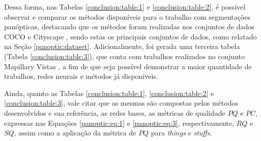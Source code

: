 Dessa forma, nas Tabelas \ref{conclusion:table:1} e \ref{conclusion:table:2}, é possível observar e comparar os métodos disponíveis para o trabalho com segmentações panópticas, destacando que os métodos foram realizadas nos conjuntos de dados COCO \cite{Lin2014} e Cityscape \cite{Cordts2016}, sendo estas os principais conjuntos de dados, como relatado na Seção \ref{panoptic:dataset}. Adicionalmente, foi gerada uma terceira tabela (Tabela \ref{conclusion:table:3}), que conta com trabalhos realizados no conjunto Mapillary Vistas \cite{Neuhold2017_ICCV}, a fim de que seja possível demonstrar a maior quantidade de trabalhos, redes neurais e métodos já disponíveis.

Ainda, quanto as Tabelas \ref{conclusion:table:1}, \ref{conclusion:table:2} e \ref{conclusion:table:3}, vale citar que as mesmas são compostas pelos métodos desenvolvidos e sua referência, as redes bases, as métricas de qualidade $PQ$ e $PC$, expressas nas Equações \ref{panoptic:eq:1} e \ref{panoptic:eq:3}, respectivamente, $RQ$ e $SQ$, assim como a aplicação da métrica de $PQ$ para \textit{things} e \textit{stuffs}.

